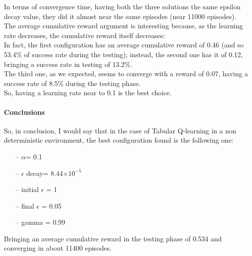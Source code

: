 \documentclass{article}
\begin{document}
\clearpage

In terms of convergence time, having both the three solutions the same epsilon decay value, they did it almost near the same episodes (near 11000 episodes).
\\
The average cumulative reward argument is interesting because, as the learning rate decreases, the cumulative reward itself decreases:
\\
In fact, the first configuration has an average cumulative reward of 0.46 (and so 53.4\% of success rate during the testing); instead, the second one has it of 0.12, bringing a success rate in testing of 13.2\%.
\\
The third one, as we expected, seems to converge with a reward of 0.07, having a success rate of 8.5\% during the testing phase.
\\
So, having a learning rate near to 0.1 is the best choice. 


\paragraph{Conclusions}

So, in conclusion, I would say that in the case of Tabular Q-learning in a non deterministic environment, the best configuration found is the following one:


\begin{itemize}
\item[--] $\alpha$= 0.1
\item[--] $\epsilon$ decay= 8.44$\times10^{-5}$
\item[--] initial $\epsilon$ = 1
\item[--] final $\epsilon$ = 0.05
\item[--] gamma = 0.99
\end{itemize}

Bringing an average cumulative reward in the testing phase of 0.534 and converging in about 11400 episodes.
\end{document}
